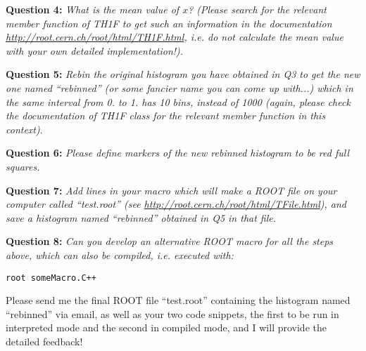 \documentclass[11pt]{article}
\begin{document}
\bigskip

\noindent\textbf{Question 4:} {\it What is the mean value of $x$? (Please search for the relevant member function of TH1F to get such an information in the documentation \url{http://root.cern.ch/root/html/TH1F.html}, i.e. do not calculate the mean value with your own detailed implementation!).}

\bigskip

\noindent\textbf{Question 5:} {\it Rebin the original histogram you have obtained in Q3 to get the new one named ``rebinned'' (or some fancier name you can come up with...) which in the same interval from 0. to 1. has 10 bins, instead of 1000 (again, please check the documentation of TH1F class for the relevant member function in this context)}.

\bigskip

\noindent\textbf{Question 6:} {\it Please define markers of the new rebinned histogram to be red full squares.} 

\bigskip

\noindent\textbf{Question 7:} {\it Add lines in your macro which will make a ROOT file on your computer called ``test.root'' (see \url{http://root.cern.ch/root/html/TFile.html}), and save a histogram named ``rebinned'' obtained in Q5 in that file.}

\bigskip

\noindent\textbf{Question 8:} {\it Can you develop an alternative ROOT macro for all the steps above, which can also be compiled, i.e. executed with:}
%
\begin{verbatim}
root someMacro.C++
\end{verbatim}
%

\bigskip

\noindent Please send me the final ROOT file ``test.root'' containing the histogram named ``rebinned'' via email, as well as your two code snippets, the first to be run in interpreted mode and the second in compiled mode, and I will provide the detailed feedback!
\end{document}
